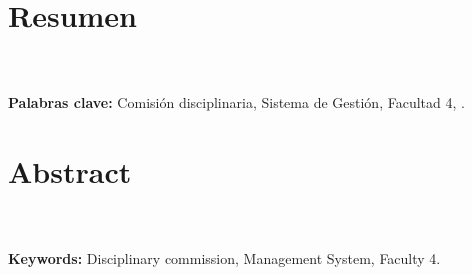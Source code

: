 \section*{Resumen}
    \lipsum[1]
	\\ \\
	\textbf{Palabras clave: }
	Comisión disciplinaria, Sistema de Gestión, Facultad 4, \uci.


\section*{Abstract}
	\lipsum[1]
	\\ \\
	\textbf{Keywords: }
	Disciplinary commission, Management System, Faculty 4.